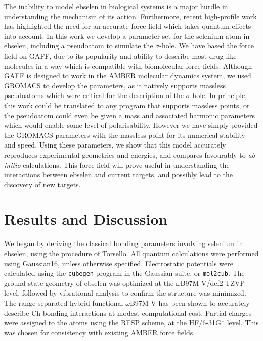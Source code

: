 \begin{refsection}
The inability to model ebselen in biological systems is a major hurdle in understanding the mechanism of its action.
Furthermore, recent high-profile work has highlighted the need for an accurate force field which takes quantum effects into account.\autocite{Weglarz-Tomczak2021,Menendez2020}
In this work we develop a parameter set for the selenium atom in ebselen, including a pseudoatom to simulate the $ \sigma $-hole.
We have based the force field on GAFF, due to its popularity and ability to describe most drug like molecules in a way which is compatible with biomolecular force fields.
Although GAFF is designed to work in the AMBER molecular dynamics system, we used GROMACS to develop the parameters, as it natively supports massless pseudoatoms which were critical for the description of the $ \sigma $-hole.
In principle, this work could be translated to any program that supports massless points, or the pseudoatom could even be given a mass and associated harmonic parameters which would enable some level of polarisability.
However we have simply provided the GROMACS parameters with the massless point for its numerical stability and speed.
Using these parameters, we show that this model accurately reproduces experimental geometries and energies, and compares favourably to \emph{ab initio} calculations.
This force field will prove useful in understanding the interactions between ebselen and current targets, and possibly lead to the discovery of new targets.

\section{Results and Discussion}
We began by deriving the classical bonding parameters involving selenium in ebselen, using the procedure of Torsello.\autocite{Torsello2016}
All quantum calculations were performed using Gaussian16, unless otherwise specified.\autocite{gaussian16}
Electrostatic potentials were calculated using the \texttt{cubegen} program in the Gaussian suite, or \texttt{mol2cub}.\autocite{mol2cub}
The ground state geometry of ebselen was optimized at the $ \omega $B97M-V/def2-TZVP level, followed by vibrational analysis to confirm the structure was minimized.\autocite{Chai2008,Weigend2005,Weigend2006}
The range-separated hybrid functional $ \omega $B97M-V has been shown to accurately describe Ch-bonding interactions at modest computational cost.\autocite{Mehta2021}
Partial charges were assigned to the atoms using the RESP scheme, at the HF/6-31G* level.\autocite{Cornell1993}
This was chosen for consistency with existing AMBER force fields.


\end{refsection}
